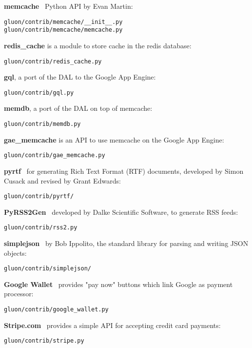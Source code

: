 \documentclass[justified,sixbynine,notoc]{tufte-book}
\def\inxx#1{\index{#1}}
\begin{document}
\begin{fullwidth}
{\bf memcache}~\cite{memcache}  Python API by Evan Martin:
\begin{lstlisting}
gluon/contrib/memcache/__init__.py
gluon/contrib/memcache/memcache.py
\end{lstlisting}

{\bf redis\_cache} \inxx{redis} is a module to store cache in the redis database:
\begin{lstlisting}
gluon/contrib/redis_cache.py
\end{lstlisting}

{\bf gql}, a port of the DAL to the Google App Engine:
\begin{lstlisting}
gluon/contrib/gql.py
\end{lstlisting}

{\bf memdb}, a port of the DAL on top of memcache:
\begin{lstlisting}
gluon/contrib/memdb.py
\end{lstlisting}

{\bf gae\_memcache} is an API to use memcache on the Google App Engine:
\begin{lstlisting}
gluon/contrib/gae_memcache.py
\end{lstlisting}

{\bf pyrtf}~\cite{pyrtf}  for generating Rich Text Format (RTF) documents, developed by Simon Cusack and revised by Grant Edwards:
\begin{lstlisting}
gluon/contrib/pyrtf/
\end{lstlisting}

{\bf PyRSS2Gen}~\cite{pyrss2gen}  developed by Dalke Scientific Software, to generate RSS feeds:
\begin{lstlisting}
gluon/contrib/rss2.py
\end{lstlisting}

{\bf simplejson}~\cite{simplejson}  by Bob Ippolito, the standard library for parsing and writing JSON objects:
\begin{lstlisting}
gluon/contrib/simplejson/
\end{lstlisting}

{\bf Google Wallet}~\cite{googlewallet}
provides "pay now" buttons which link Google as payment processor:
\begin{lstlisting}
gluon/contrib/google_wallet.py
\end{lstlisting}

{\bf Stripe.com}~\cite{stripe} provides a simple API for accepting credit card payments:
\begin{lstlisting}
gluon/contrib/stripe.py
\end{lstlisting}


\end{fullwidth}
\end{document}
